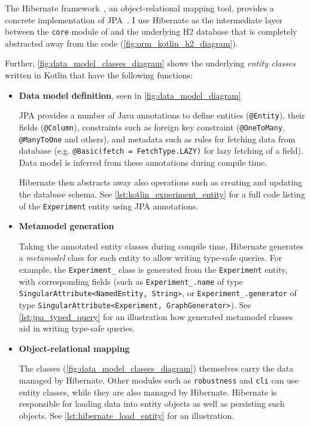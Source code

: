 The Hibernate framework~\cite{ElliottHibernateDeveloperNotebook2004}, an object-relational mapping tool, provides a concrete implementation of JPA~\cite{BauerJavaPersistenceHibernate2015}.
I use Hibernate as the intermediate layer between the \texttt{core} module of \graffs and the underlying H2 database that is completely abstracted away from the \graffs code (\autoref{fig:orm_kotlin_h2_diagram}).



Further, \autoref{fig:data_model_classes_diagram} shows the underlying \textsl{entity classes} written in Kotlin that have the following functions:
\begin{itemize}[topsep=5pt,label=$\bm{\rightarrow}$]
    \item \textbf{Data model definition}, seen in \autoref{fig:data_model_diagram}

    JPA provides a number of Java annotations to define entities (\texttt{@Entity}), their fields (\texttt{@Column}), constraints such as foreign key constraint (\texttt{@OneToMany}, \texttt{@ManyToOne} and others), and metadata such as rules for fetching data from database (e.g. \texttt{@Basic(fetch = FetchType.LAZY)} for lazy fetching of a field).
    Data model is inferred from these annotations during compile time.

    Hibernate then abstracts away also operations such as creating and updating the database schema.
    See \autoref{lst:kotlin_experiment_entity} for a full code listing of the \texttt{Experiment} entity using JPA annotations.

    

    \item \textbf{Metamodel generation}

    Taking the annotated entity classes during compile time, Hibernate generates a \textsl{metamodel} class for each entity to allow writing type-safe queries.
    For example, the \texttt{Experiment\_} class is generated from the \texttt{Experiment} entity, with corresponding fields (such as \texttt{Experiment\_.name} of type \texttt{SingularAttribute<NamedEntity, String>}, or \texttt{Experiment\_.generator} of type \texttt{SingularAttribute<Experiment, GraphGenerator>}).
    See \autoref{lst:jpa_typed_query} for an illustration how generated metamodel classes aid in writing type-safe queries.

    \item \textbf{Object-relational mapping}

    The classes (\autoref{fig:data_model_classes_diagram}) themselves carry the data managed by Hibernate.
    Other modules such as \texttt{robustness} and \texttt{cli} can use entity classes, while they are also managed by Hibernate.
    Hibernate is responsible for loading data into entity objects as well as persisting such objects.
    See \autoref{lst:hibernate_load_entity} for an illustration.
\end{itemize}

